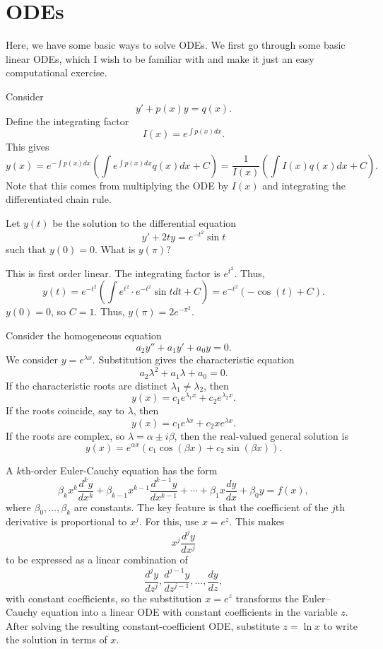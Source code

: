 \section{ODEs}

Here, we have some basic ways to solve ODEs. We first go 
through some basic linear ODEs, which I wish to be familiar 
with and make it just an easy computational exercise.

\begin{example}
Consider
\[
y' + p(x)y = q(x).
\]
Define the integrating factor
\[
I(x)=e^{\int p(x) dx}.
\]
This gives
\[
y(x)
=
e^{-\int p(x) dx}
\left(
\int e^{\int p(x) dx}q(x)dx+C
\right) = \frac{1}{I(x)} \left( \int I(x) q(x) dx + C \right).
\]
Note that this comes from multiplying the ODE by $I(x)$ and
integrating the differentiated chain rule.
\end{example}


\begin{exercise}
Let $y(t)$ be the solution to the differential equation
\[
y' + 2ty = e^{-t^2}\sin t
\]
such that $y(0)=0$. What is $y(\pi)$?
\end{exercise}
\begin{solution}
This is first order linear. The integrating factor is $e^{t^2}$.
Thus,
\[
y(t) = e^{-t^2} \left(\int e^{t^2} \cdot e^{-t^2}\sin t dt +C \right)
= e^{-t^2} (-\cos(t) + C).
\]
$y(0) = 0$, so $C = 1$. Thus, $y(\pi) = 2e^{-\pi^2}$.
\end{solution}

\begin{example}
Consider the homogeneous equation
\[
a_2y''+a_1y'+a_0y=0.
\]
We consider $y = e^{\lambda x}$. 
Substitution gives the characteristic equation
\[
a_2\lambda^2+a_1\lambda+a_0=0.
\]
If the characteristic roots are distinct $\lambda_1 \neq \lambda_2$, then
\[
y(x)=c_1e^{\lambda_1x}+c_2e^{\lambda_2x}.
\]
If the roots coincide, say to $\lambda$, then
\[
y(x) = c_1 e^{\lambda x} + c_2 x e^{\lambda x}.
\]
If the roots are complex, so $\lambda=\alpha\pm i\beta$, 
then the real-valued general solution is
\[
y(x) = e^{\alpha x}
\left(
c_1\cos(\beta x)+c_2\sin(\beta x)
\right).
\]
\end{example}

\begin{example}
A $k$th-order Euler-Cauchy equation has the form
\[
\beta_k x^k \frac{d^k y}{dx^k}
+
\beta_{k-1}x^{k-1}\frac{d^{k-1}y}{dx^{k-1}}
+\cdots+
\beta_1x\frac{dy}{dx}
+
\beta_0y
=
f(x),
\]
where $\beta_0,\ldots,\beta_k$ are constants. 
The key feature is that the coefficient of the $j$th derivative 
is proportional to $x^j$.
For this, use $x = e^z$. This makes
\[
x^j\frac{d^j y}{dx^j}
\]
to be expressed as a linear combination of
\[
\frac{d^j y}{dz^j},
\frac{d^{j-1}y}{dz^{j-1}},
\ldots,
\frac{dy}{dz},
\]
with constant coefficients, so the substitution $x=e^z$ transforms 
the Euler--Cauchy equation into a linear ODE with constant coefficients 
in the variable $z$. After solving the resulting constant-coefficient ODE, substitute
$z=\ln x$ to write the solution in terms of $x$.
\end{example}

